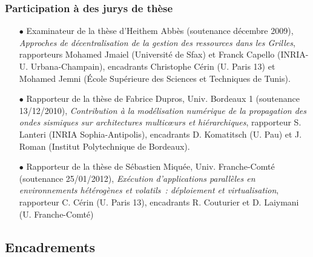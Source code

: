 \documentclass[11pt]{article}
\begin{document}
\subsubsection{Participation à des jurys de thèse}

\begin{itemize}
\item[$\bullet$] 
Examinateur de la thèse d'Heithem Abbès (soutenance décembre 2009), 
\textit{Approches de décentralisation de la gestion des ressources dans les Grilles},
rapporteurs Mohamed Jmaiel (Université de Sfax) et Franck Capello (INRIA-U. Urbana-Champain), 
encadrants Christophe Cérin (U. Paris 13) et Mohamed Jemni (École Supérieure des Sciences et Techniques de Tunis).\\

\item[$\bullet$] 
Rapporteur de la thèse de Fabrice Dupros, Univ. Bordeaux 1 (soutenance 13/12/2010), 
\textit{Contribution à la modélisation numérique de la propagation des ondes sismiques sur architectures
multic{\oe}urs et hiérarchiques},
rapporteur S. Lanteri (INRIA Sophia-Antipolis), 
encadrants D. Komatitsch (U. Pau) et J. Roman (Institut Polytechnique de Bordeaux).\\

\item[$\bullet$] 
Rapporteur de la thèse de Sébastien Miquée, Univ. Franche-Comté (soutenance 25/01/2012), 
\textit{Exécution d'applications parallèles en environnements hétérogènes et volatils~: 
déploiement et virtualisation},
rapporteur C. Cérin (U. Paris 13), 
encadrants R. Couturier et D. Laiymani (U. Franche-Comté) 
\end{itemize}




\subsection{Encadrements}
\end{document}
